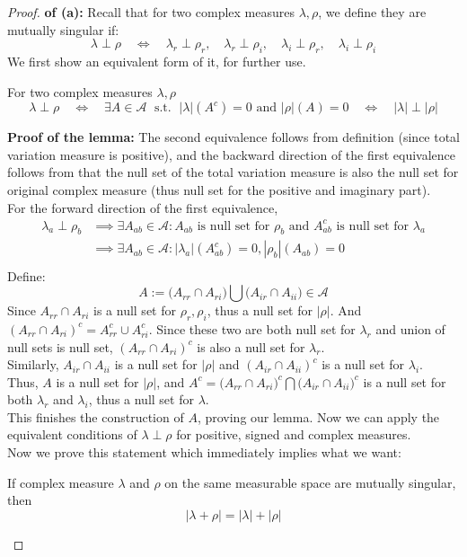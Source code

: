 \documentclass[lang=cn,11pt]{elegantbook}
\begin{document}
\begin{proof}
   \textbf{ of (a):}
   Recall that for two complex measures $\lambda,\rho$, we define they are mutually singular if: $$
\lambda \perp \rho \quad \Longleftrightarrow \quad \lambda_r \perp \rho_r, \quad \lambda_r \perp \rho_i, \quad \lambda_i \perp \rho_r, \quad \lambda_i \perp \rho_i
$$
We first show an equivalent form of it, for further use.\\
\begin{lemma}
    For two complex measures $\lambda,\rho$ \[
    \lambda \perp \rho \quad \iff \quad \exists A
    \in  \mathcal{A}\; \text{ s.t. } \; |\lambda|(A^c)=0\text{ and }|\rho|(A)=0  \quad \iff \quad |\lambda| \perp |\rho|
    \]
\end{lemma}
\noindent \textbf{Proof of the lemma:} The second equivalence follows from definition (since total variation measure is positive), and the backward direction of the first equivalence follows from that the null set of the total variation measure is also the null set for original complex measure (thus null set for the positive and imaginary part).\\
For the forward direction of the first equivalence, $$
\begin{aligned}
 \lambda_a \perp \rho_b &\implies     \exists A_{ab} \in \mathcal{A}:A_{ab} \text{ is null set for }   \rho_b \text{ and } A^c_{ab} \text{ is null set for } \lambda_a \\
&\implies \exists A_{ab} \in \mathcal{A}: |\lambda_a | \left(A^c_{ab}\right)=0, |\rho_b| \left(A_{ab}\right)=0 \\
\end{aligned}
$$
Define: $$
A:=\bigg(A_{r r} \cap A_{r i}\bigg)  \bigcup \bigg( A_{i r} \cap A_{i i}\bigg) \in \mathcal{A}
$$
Since $A_{r r} \cap A_{r i}$ is a null set for $\rho_r,\rho_i$, thus a null set for $|\rho|$. And $(A_{r r} \cap A_{r i})^c = A_{r r}^c \cup A_{r i}^c$. Since these two are both null set for $\lambda_r$ and union of null sets is null set, $(A_{r r} \cap A_{r i})^c$ is also a null set for $\lambda_r$.\\
Similarly, $ A_{i r} \cap A_{i i}$ is a null set for $|\rho|$ and $ (A_{i r} \cap A_{i i})^c$ is a null set for $\lambda_i$.\\
Thus, $A$ is a null set for $|\rho|$, and $A^c  = \big(A_{r r} \cap A_{r i}\big)^c  \bigcap \big( A_{i r} \cap A_{i i}\big)^c $ is a null set for both $\lambda_r$
 and $\lambda_i$, thus a null set for $\lambda$.\\
 This finishes the construction of $A$, proving our lemma. Now we can apply the equivalent conditions of $\lambda \perp \rho$ for positive, signed and complex measures.\\
Now we prove this statement which immediately implies what we want: 
\begin{proposition}
    If complex measure \(\lambda\) and \(\rho\) on the same measurable space are mutually singular, then \[
|\lambda+\rho|=|\lambda|+|\rho|
\]


\end{proposition}
\end{proof}
\end{document}
